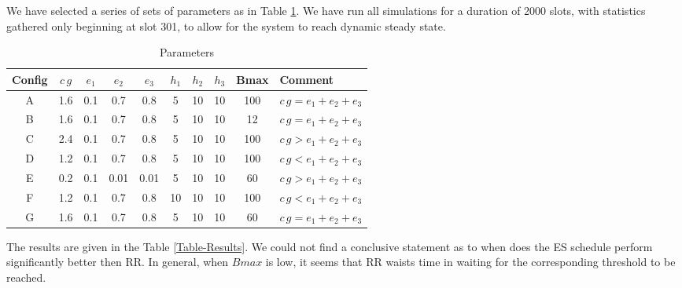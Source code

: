 \documentclass[12 pt]{article}
\newcommand{\debug}[1]{\mbox{\tt #1}}
\renewcommand{\debug}[1]{}              \newcommand{\cmd}[1]{}
\newcommand{\2}{\>\>}
\newcommand{\3}{\>\>\>}
\newcommand{\4}{\>\>\>\>}
\newcommand{\5}{\>\>\>\>\>}
\newcommand{\6}{\>\>\>\>\>\>}
\newcommand{\7}{\6\>}
\newcommand{\8}{\6\2}
\newcommand{\dref}[1]{\ref{#1}\debug{[#1]}\cmd{dref}}
\newcounter{protblock}
\newcounter{line}[protblock]
\begin{document}
We have selected a series of sets of parameters as in Table \dref{Table-Param}.  We have run all simulations for a duration of 2000 slots, with statistics gathered only beginning at slot 301, to allow for the system to reach dynamic steady state.

\begin{table}[hbtp]
\begin{center}
\begin{tabular}{|c|c|c|c|c|c|c|c|c|l|}
\hline
Config & $c\,g$ & $e_1$   &   $e_2$   & $e_3$ & $h_1$ & $h_2$    & $h_3$ & Bmax & Comment \\ \hline
A &  1.6 & 0.1 & 0.7 & 0.8 & 5 & 10 & 10 & 100 &   $c\,g = e_1 +e_2 + e_3$ \\  \hline
B & 1.6 & 0.1 & 0.7 & 0.8 & 5 & 10 & 10 & 12 &    $c\,g = e_1 +e_2 + e_3$ \\  \hline
C & 2.4 & 0.1 & 0.7 & 0.8 & 5 & 10 & 10 & 100 &    $c\,g > e_1 +e_2 + e_3$ \\  \hline
D & 1.2 & 0.1 & 0.7 & 0.8 & 5 & 10 & 10 & 100 &     $c\,g < e_1 +e_2 + e_3$ \\  \hline
E & 0.2  & 0.1 & 0.01 & 0.01 & 5 & 10 & 10 & 60 &   $c\,g > e_1 +e_2 + e_3$ \\  \hline
F & 1.2 & 0.1 & 0.7 & 0.8 & 10 & 10 & 10 & 100 &     $c\,g < e_1 +e_2 + e_3$ \\  \hline
G & 1.6 & 0.1 & 0.7 & 0.8 & 5 & 10 & 10 & 60 &      $c\,g = e_1 +e_2 + e_3$ \\  \hline
\end{tabular}
\caption{Parameters\debug{\fbox{Table-Param}}\label{Table-Param}}
\end{center}
\end{table}

The results are given in the Table \dref{Table-Results}.  We could not find a conclusive statement as to when does the ES schedule perform significantly better then RR.  In general, when $Bmax$ is low, it seems that RR waists time in waiting for the corresponding threshold to be reached.
\end{document}
